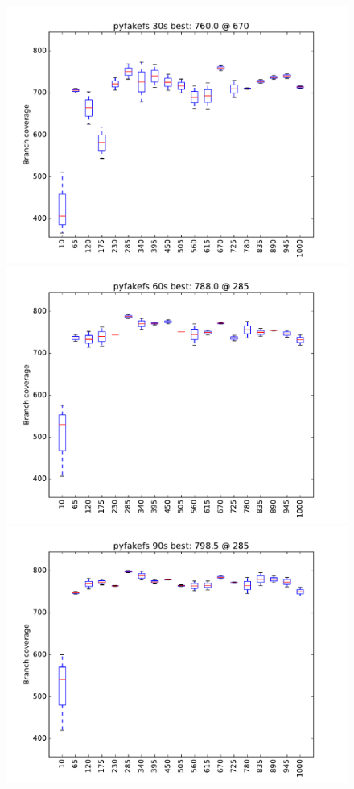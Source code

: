 \begin{figure}
\includegraphics[width=\columnwidth]{graphs/pyfakefsrand30}
\includegraphics[width=\columnwidth]{graphs/pyfakefsrand60}
\includegraphics[width=\columnwidth]{graphs/pyfakefsrand90}
\end{figure}

